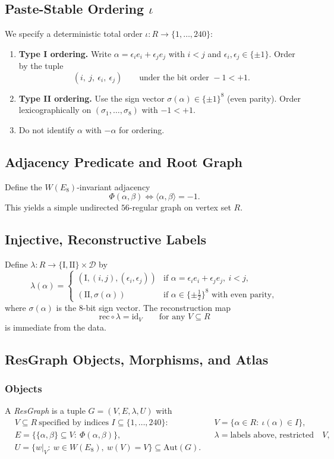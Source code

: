 \documentclass[12pt]{article}
\begin{document}
\subsection{Paste-Stable Ordering \texorpdfstring{$\iota$}{iota}}
We specify a deterministic total order $\iota:R\to\{1,\dots,240\}$:
\begin{enumerate}[itemsep=2pt,topsep=4pt,leftmargin=16pt]

\item \textbf{Type I ordering.} Write $\alpha=\epsilon_i e_i+\epsilon_j e_j$ with $i<j$ and $\epsilon_i,\epsilon_j\in\{\pm1\}$. Order by the tuple
\[
(i,\ j,\ \epsilon_i,\ \epsilon_j)\qquad\text{under the bit order }-1<+1.
\]
\item \textbf{Type II ordering.} Use the sign vector $\sigma(\alpha)\in\{\pm1\}^8$ (even parity). Order lexicographically on $(\sigma_1,\dots,\sigma_8)$ with $-1<+1$.
\item Do not identify $\alpha$ with $-\alpha$ for ordering.
\end{enumerate}

\subsection{Adjacency Predicate and Root Graph}
Define the $W(E_8)$-invariant adjacency
\[
\Phi(\alpha,\beta)\iff \langle \alpha,\beta\rangle=-1.
\]
This yields a simple undirected $56$-regular graph on vertex set $R$.

\subsection{Injective, Reconstructive Labels}
Define $\lambda:R\to \{\mathrm{I},\mathrm{II}\}\times\mathcal{D}$ by
\[
\lambda(\alpha)=
\begin{cases}
(\mathrm{I},(i,j),(\epsilon_i,\epsilon_j))& \text{if }\alpha=\epsilon_i e_i+\epsilon_j e_j,\ i<j,\\[2pt]
(\mathrm{II},\sigma(\alpha))& \text{if }\alpha\in\{\pm\tfrac12\}^8\text{ with even parity},
\end{cases}
\]
where $\sigma(\alpha)$ is the $8$-bit sign vector. The reconstruction map
\[
\mathrm{rec}\circ\lambda=\mathrm{id}_V\qquad\text{for any }V\subseteq R
\]
is immediate from the data.

\subsection{ResGraph Objects, Morphisms, and Atlas}
\subsubsection*{Objects}
A \emph{ResGraph} is a tuple $G=(V,E,\lambda,U)$ with
\begin{align*}
&V\subseteq R\ \text{specified by indices }I\subseteq\{1,\dots,240\}: &&V=\{\alpha\in R:\ \iota(\alpha)\in I\},\\
&E=\bigl\{\{\alpha,\beta\}\subseteq V:\ \Phi(\alpha,\beta)\bigr\},\qquad
&&\lambda=\text{labels above, restricted to }V,\\
&U=\{w|_V:\ w\in W(E_8),\ w(V)=V\}\subseteq \mathrm{Aut}(G).
\end{align*}
\end{document}

